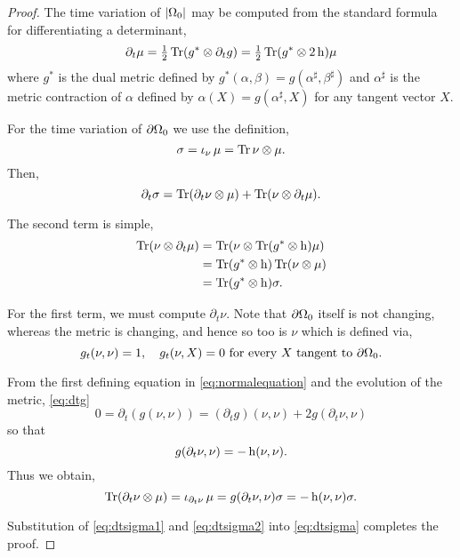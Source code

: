 \documentclass{amsart}
\begin{document}
\begin{proof}
The time variation of \(\left|{\Omega_0}\right|\) may be computed from the standard formula for differentiating a determinant,
\[
\partial_t \mu = \tfrac{1}{2}\operatorname{Tr}(g^{\ast} \otimes \partial_t g) =  \tfrac{1}{2} \operatorname{Tr} (g^{\ast} \otimes 2\operatorname{h})\mu
\]
where \(g^{\ast}\) is the dual metric defined by \(g^{\ast} (\alpha, \beta) = g(\alpha^{\sharp}, \beta^{\sharp})\) and \(\alpha^{\sharp}\) is the metric contraction of \(\alpha\) defined by \(\alpha(X) = g(\alpha^{\sharp}, X)\) for any tangent vector \(X\).

For the time variation of \(\partial {\Omega_0}\) we use the definition,
\[
\sigma = \operatorname{\iota}_{\nu} \mu = \operatorname{Tr} \nu \otimes \mu.
\]
Then,
\begin{equation}
\label{eq:dtsigma}
\partial_t \sigma = \operatorname{Tr}(\partial_t \nu \otimes \mu) + \operatorname{Tr}(\nu \otimes \partial_t \mu).
\end{equation}

The second term is simple,
\begin{equation}
\label{eq:dtsigma2}
\begin{split}
\operatorname{Tr}(\nu \otimes \partial_t \mu) &= \operatorname{Tr}(\nu \otimes \operatorname{Tr}(g^{\ast} \otimes \operatorname{h}) \mu) \\
&= \operatorname{Tr}(g^{\ast} \otimes \operatorname{h}) \operatorname{Tr} (\nu \otimes \mu) \\
&= \operatorname{Tr}(g^{\ast} \otimes \operatorname{h}) \sigma.
\end{split}
\end{equation}

For the first term, we must compute \(\partial_t \nu\). Note that \(\partial {\Omega_0}\) itself is not changing, whereas the metric is changing, and hence so too is \(\nu\) which is defined via,
\begin{equation}
\label{eq:normalequation}
g_t(\nu, \nu) = 1, \quad g_t(\nu, X) = 0 \text{ for every \(X\) tangent to \(\partial {\Omega_0}\)}.
\end{equation}

From the first defining equation in \eqref{eq:normalequation} and the evolution of the metric, \eqref{eq:dtg}
\[
0 = \partial_t (g(\nu, \nu)) = (\partial_t g) (\nu, \nu) + 2g(\partial_t \nu, \nu)
\]
so that
\[
g(\partial_t \nu, \nu) = -\operatorname{h}(\nu, \nu).
\]
Thus we obtain,
\begin{equation}
\label{eq:dtsigma1}
\operatorname{Tr}(\partial_t \nu \otimes \mu) = \operatorname{\iota}_{\partial_t\nu} \mu =  g(\partial_t \nu, \nu) \sigma = -\operatorname{h}(\nu, \nu) \sigma.
\end{equation}

Substitution of \eqref{eq:dtsigma1} and \eqref{eq:dtsigma2} into \eqref{eq:dtsigma} completes the proof.
\end{proof}
\end{document}
